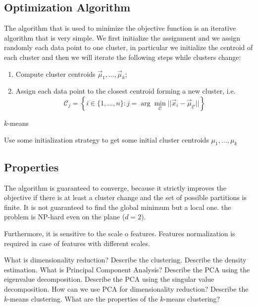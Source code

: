 \subsection{Optimization Algorithm}
The algorithm that is used to minimize the objective function is an iterative algorithm that is very simple. We first initialize the assignment and we assign randomly each data point to one cluster, in particular we initialize the centroid of each cluster and then we will iterate the following steps while clusters change:
\begin{enumerate}
    \item Compute cluster centroids \(\vec{\mu}_1, ..., \vec{\mu}_k\);
    \item Assign each data point to the closest centroid forming a new cluster, i.e.
    \begin{equation}
        \mathcal{C}_j = \left\{ i \in \{1, ..., n\} : j = \arg \min_\mathcal{C} || \vec{x}_i - \vec{\mu}_\mathcal{C} || \right\}
    \end{equation}
\end{enumerate}

\begin{algorithm}
    \caption{$k$-means}
    Use some initialization strategy to get some initial cluster centroids $\mu_1,\ldots,\mu_k$\;
\end{algorithm}

\subsection{Properties}
The algorithm is guaranteed to converge, because it strictly improves the objective if there is at least a cluster change and the set of possible partitions is finite. It is not guaranteed to find the global minimum but a local one. the problem is NP-hard even on the plane (\(d=2\)). 

Furthermore, it is sensitive to the scale o features. Features normalization is required in case of features with different scales.

\newpage
\begin{exercise}
    \ex What is dimensionality reduction?
    \ex Describe the clustering.
    \ex Describe the density estimation.
    \ex What is Principal Component Analysis?
    \ex Describe the PCA using the eigenvalue decomposition.
    \ex Describe the PCA using the singular value decomposition.
    \ex How can we use PCA for dimensionality reduction?
    \ex Describe the \(k\)-means clustering.
    \ex What are the properties of the \(k\)-means clustering?
\end{exercise}